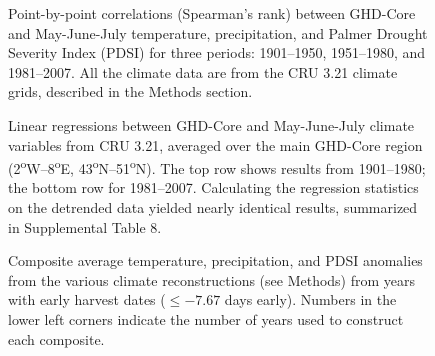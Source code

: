 \documentclass[final]{nature}
\begin{document}
\begin{figure}
\caption{Point-by-point correlations (Spearman's rank) between GHD-Core and May-June-July temperature, precipitation, and Palmer Drought Severity Index (PDSI) for three periods: 1901--1950, 1951--1980, and 1981--2007. All the climate data are from the CRU 3.21 climate grids, described in the Methods section.}
\end{figure}

\begin{figure}
\caption{Linear regressions between GHD-Core and May-June-July climate variables from CRU 3.21, averaged over the main GHD-Core region (2\textsuperscript{o}W--8\textsuperscript{o}E, 43\textsuperscript{o}N--51\textsuperscript{o}N). The top row shows results from 1901--1980; the bottom row for 1981--2007. Calculating the regression statistics on the detrended data yielded nearly identical results, summarized in Supplemental Table 8.}
\end{figure}

\begin{figure}
\caption{Composite average temperature, precipitation, and PDSI anomalies from the various climate reconstructions (see Methods) from years with early harvest dates ($\le-7.67$ days early). Numbers in the lower left corners indicate the number of years used to construct each composite.}
\end{figure}

\end{document}
